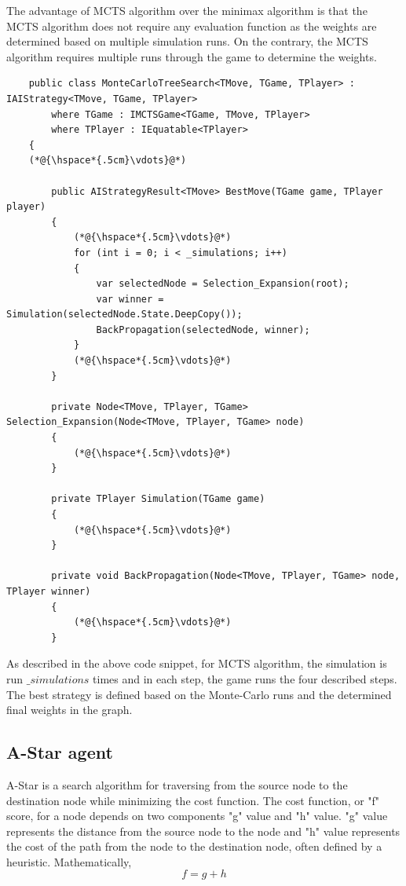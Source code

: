 The advantage of \gls{MCTS} algorithm over the minimax algorithm is that the \gls{MCTS} algorithm does not require any evaluation function as the weights are determined based on multiple simulation runs. On the contrary, the \gls{MCTS} algorithm requires multiple runs through the game to determine the weights.

\begin{lstlisting}
    public class MonteCarloTreeSearch<TMove, TGame, TPlayer> : IAIStrategy<TMove, TGame, TPlayer>
        where TGame : IMCTSGame<TGame, TMove, TPlayer>
        where TPlayer : IEquatable<TPlayer>
    {
    (*@{\hspace*{.5cm}\vdots}@*)    

        public AIStrategyResult<TMove> BestMove(TGame game, TPlayer player)
        {
            (*@{\hspace*{.5cm}\vdots}@*)
            for (int i = 0; i < _simulations; i++)
            {
                var selectedNode = Selection_Expansion(root);
                var winner = Simulation(selectedNode.State.DeepCopy());
                BackPropagation(selectedNode, winner);
            }
            (*@{\hspace*{.5cm}\vdots}@*)
        }

        private Node<TMove, TPlayer, TGame> Selection_Expansion(Node<TMove, TPlayer, TGame> node)
        {
            (*@{\hspace*{.5cm}\vdots}@*)
        }

        private TPlayer Simulation(TGame game)
        {
            (*@{\hspace*{.5cm}\vdots}@*)
        }

        private void BackPropagation(Node<TMove, TPlayer, TGame> node, TPlayer winner)
        {
            (*@{\hspace*{.5cm}\vdots}@*)        
        }
\end{lstlisting}

As described in the above code snippet, for \gls{MCTS} algorithm, the simulation is run \textit{${\_}simulations$} times and in each step, the game runs the four described steps. The best strategy is defined based on the Monte-Carlo runs and the determined final weights in the graph.

\subsection{A-Star agent}
A-Star is a search algorithm for traversing from the source node to the destination node while minimizing the cost function. The cost function, or "f" score, for a node depends on two components "g" value and "h" value. "g" value represents the distance from the source node to the node and "h" value represents the cost of the path from the node to the destination node, often defined by a heuristic. Mathematically,
\begin{equation}
    f = g + h
\end{equation}



